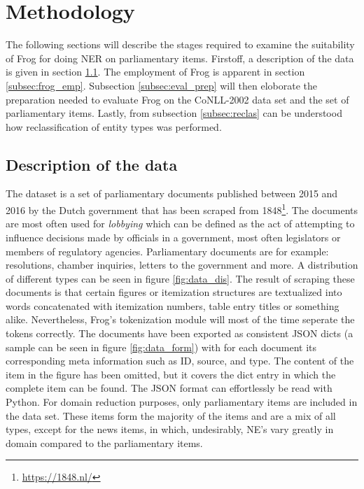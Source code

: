 \section{Methodology}
\label{sec:meth}
The following sections will describe the stages required to examine the suitability of Frog for doing NER on parliamentary items. Firstoff, a description of the data is given in section \ref{subsec:data}. The employment of Frog is apparent in section \ref{subsec:frog_emp}. Subsection \ref{subsec:eval_prep} will then eloborate the preparation needed to evaluate Frog on the CoNLL-2002 data set and the set of parliamentary items. Lastly, from subsection \ref{subsec:reclas} can be understood how reclassification of entity types was performed. 

\subsection{Description of the data}\label{subsec:data}
The dataset is a set of parliamentary documents published between 2015 and 2016 by the Dutch government that has been scraped from 1848\footnote{\url{https://1848.nl/}}. The documents are most often used for \emph{lobbying} which can be defined as the act of attempting to influence decisions made by officials in a government, most often legislators or members of regulatory agencies. Parliamentary documents are for example: resolutions, chamber inquiries, letters to the government and more. A distribution of different types can be seen in figure \ref{fig:data_dis}. The result of scraping these documents is that certain figures or itemization structures are textualized into words concatenated with itemization numbers, table entry titles or something alike. Nevertheless, Frog's tokenization module will most of the time seperate the tokens correctly.  The documents have been exported as consistent JSON dicts (a sample can be seen in figure \ref{fig:data_form}) with for each document its corresponding meta information such as ID, source, and type. The content of the item in the figure has been omitted, but it covers the dict entry in which the complete item can be found. The JSON format can effortlessly be read with Python. For domain reduction purposes, only parliamentary items are included in the data set. These items form the majority of the items and are a mix of all types, except for the news items, in which, undesirably, NE's vary greatly in domain compared to the parliamentary items.

